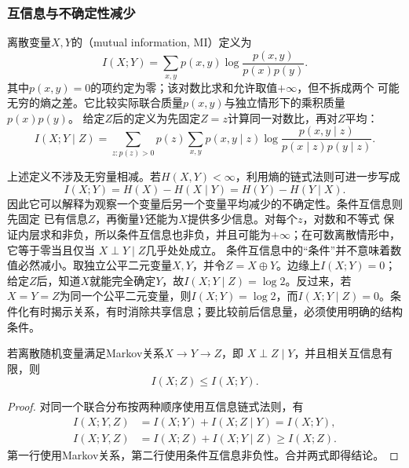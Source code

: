 \subsubsection{互信息与不确定性减少}
\begin{definition}[互信息与条件互信息]
\label{def:information-mutual-information}
离散变量\(X,Y\)的（mutual information, MI）定义为
\begin{equation}
  I(X;Y)
  =
  \sum_{x,y}p(x,y)
  \log\frac{p(x,y)}{p(x)p(y)}.
  \label{eq:information-mutual-information}
\end{equation}
其中\(p(x,y)=0\)的项约定为零；该对数比求和允许取值\(+\infty\)，但不拆成两个
可能无穷的熵之差。它比较实际联合质量\(p(x,y)\)与独立情形下的乘积质量
\(p(x)p(y)\)。
给定\(Z\)后的定义为先固定\(Z=z\)计算同一对数比，再对\(Z\)平均：
\begin{equation}
  I(X;Y\mid Z)
  =
  \sum_{z:p(z)>0}p(z)
  \sum_{x,y}p(x,y\mid z)
  \log
  \frac{p(x,y\mid z)}
       {p(x\mid z)p(y\mid z)}.
  \label{eq:information-conditional-mutual-information}
\end{equation}
\end{definition}
上述定义不涉及无穷量相减。若\(H(X,Y)<\infty\)，利用熵的链式法则可进一步写成
\begin{equation}
  I(X;Y)
  =
  H(X)-H(X\mid Y)
  =
  H(Y)-H(Y\mid X).
  \label{eq:information-mi-entropy-reduction}
\end{equation}
因此它可以解释为观察一个变量后另一个变量平均减少的不确定性。条件互信息则先固定
已有信息\(Z\)，再衡量\(Y\)还能为\(X\)提供多少信息。对每个\(z\)，对数和不等式
保证内层求和非负，所以条件互信息也非负，并且可能为\(+\infty\)；在可数离散情形中，
它等于零当且仅当
\(X\perp Y\mid Z\)几乎处处成立。
条件互信息中的“条件”并不意味着数值必然减小。取独立公平二元变量\(X,Y\)，并令\(Z=X\oplus Y\)。边缘上\(I(X;Y)=0\)；给定\(Z\)后，知道\(X\)就能完全确定\(Y\)，故\(I(X;Y\mid Z)=\log2\)。反过来，若\(X=Y=Z\)为同一个公平二元变量，则\(I(X;Y)=\log2\)，而\(I(X;Y\mid Z)=0\)。条件化有时揭示关系，有时消除共享信息；要比较前后信息量，必须使用明确的结构条件。
\begin{theorem}[数据处理不等式]
\label{thm:information-data-processing}
若离散随机变量满足Markov关系\(X\to Y\to Z\)，即
\(X\perp Z\mid Y\)，并且相关互信息有限，则
\[
  I(X;Z)\leq I(X;Y).
\]
\end{theorem}
\begin{proof}
对同一个联合分布按两种顺序使用互信息链式法则，有
\[
\begin{aligned}
  I(X;Y,Z)
  &=I(X;Y)+I(X;Z\mid Y)=I(X;Y),\\
  I(X;Y,Z)
  &=I(X;Z)+I(X;Y\mid Z)\geq I(X;Z).
\end{aligned}
\]
第一行使用Markov关系，第二行使用条件互信息非负性。合并两式即得结论。
\end{proof}
